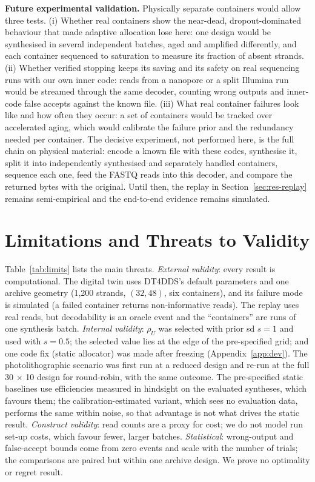 \documentclass[conference,onecolumn,11pt]{IEEEtran}
\begin{document}
\textbf{Future experimental validation.}\label{sec:wetlab}  Physically separate containers would allow
three tests.  (i) Whether real containers show the near-dead, dropout-dominated behaviour that made
adaptive allocation lose here: one design would be synthesised in several independent batches, aged and
amplified differently, and each container sequenced to saturation to measure its fraction of absent
strands.  (ii) Whether verified stopping keeps its saving and its safety on real sequencing runs with
our own inner code: reads from a nanopore or a split Illumina run would be streamed through the same
decoder, counting wrong outputs and inner-code false accepts against the known file.  (iii) What real
container failures look like and how often they occur: a set of containers would be tracked over
accelerated aging, which would calibrate the failure prior and the redundancy needed per container.  The
decisive experiment, not performed here, is the full chain on physical material: encode a known file
with these codes, synthesise it, split it into independently synthesised and separately handled
containers, sequence each one, feed the FASTQ reads into this decoder, and compare the returned bytes
with the original.  Until then, the replay in Section~\ref{sec:res-replay} remains semi-empirical and
the end-to-end evidence remains simulated.

\section{Limitations and Threats to Validity}\label{sec:limits}
Table~\ref{tab:limits} lists the main threats.  \emph{External validity}: every result is
computational.  The digital twin uses DT4DDS's default parameters and one archive geometry
(1{,}200 strands, $(32,48)$, six containers), and its failure mode is simulated (a failed container
returns non-informative reads).  The replay uses real reads, but decodability is an oracle event
and the ``containers'' are runs of one synthesis batch.  \emph{Internal validity}: $\rho_U$ was
selected with prior sd $s{=}1$ and used with $s{=}0.5$; the selected value lies at the edge of the
pre-specified grid; and one code fix (static allocator) was made after freezing
(Appendix~\ref{app:dev}).  The photolithographic scenario was first run at a reduced design and
re-run at the full 30 $\times$ 10 design for round-robin, with the same outcome.  The pre-specified
static baselines use efficiencies measured in hindsight on the evaluated syntheses, which favours
them; the calibration-estimated variant, which sees no evaluation data, performs the same within
noise, so that advantage is not what drives the static result.
\emph{Construct validity}: read counts are a proxy for cost; we do not model run set-up costs,
which favour fewer, larger batches.  \emph{Statistical}: wrong-output and false-accept bounds
come from zero events and scale with the number of trials; the comparisons are paired but within
one archive design.  We prove no optimality or regret result.

\end{document}
